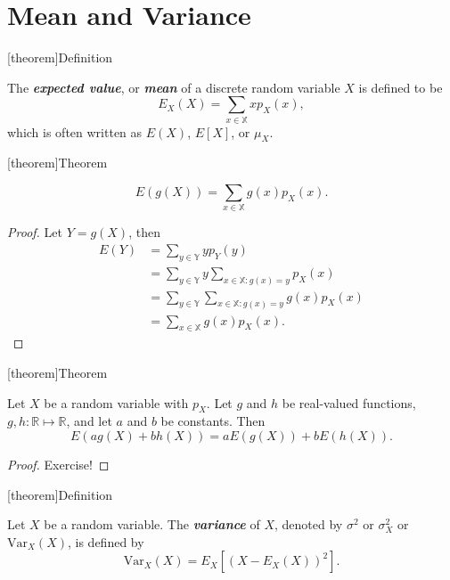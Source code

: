 \documentclass[12pt]{report}
\theoremstyle{definition}
\begin{document}
\section{Mean and Variance}

[theorem]{Definition}
\begin{mean}
    The \textbf{\emph{expected value}}, or \textbf{\emph{mean}} of a discrete
    random variable $X$ is defined to be 
    \[
        E_X(X)=\sum_{x\in\mathbb{X}} xp_X(x),
    \]
    which is often written as $E(X)$, $E[X]$, or $\mu_X$.
\end{mean}

[theorem]{Theorem}
\begin{E(g(X))}
    \[
        E(g(X))=\sum_{x\in\mathbb{X}} g(x)p_X(x).
    \]
\end{E(g(X))}
\begin{proof}
    Let $Y=g(X)$, then
    \begin{align*}
        E(Y) & = \sum_{y\in \mathbb{Y}} yp_Y(y) \\
             & = \sum_{y\in \mathbb{Y}} y \sum_{x\in\mathbb{X}:g(x)=y} p_X(x) \\
             & = \sum_{y\in \mathbb{Y}} \sum_{x\in\mathbb{X}:g(x)=y} g(x)p_X(x) \\
             & = \sum_{x\in\mathbb{X}} g(x)p_X(x).
    \end{align*} 
\end{proof} 

[theorem]{Theorem}
\begin{linearity of expectation}
    Let $X$ be a random variable with $p_X$. Let $g$ and $h$ be real-valued
    functions, $g,h:\mathbb{R}\mapsto\mathbb{R}$, and let $a$ and $b$ be
    constants. Then
    \[
        E(ag(X)+bh(X)) = aE(g(X))+bE(h(X)).
    \]
\end{linearity of expectation}
\begin{proof}
    Exercise!
\end{proof} 

[theorem]{Definition}
\begin{variance}
    Let $X$ be a random variable. The \textbf{\emph{variance}} of $X$, denoted
    by $\sigma^{2}$ or $\sigma_X^{2}$ or $\text{Var}_X(X)$,
    is defined by
    \[
        \text{Var}_X(X)=E_X\left[{(X-E_X(X))}^{2}\right].
    \]
\end{variance}
\end{document}
